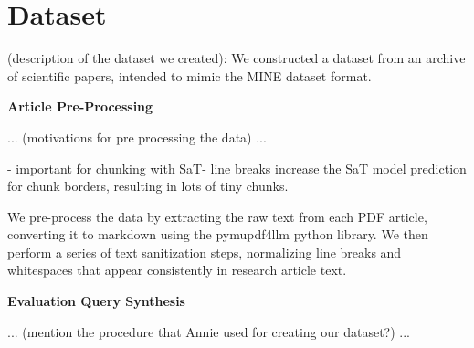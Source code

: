 \section {Dataset}
(description of the dataset we created):
We constructed a dataset from an archive of scientific papers, intended to
mimic the MINE dataset format. 

\textbf{Article Pre-Processing}

... (motivations for pre processing the data) ...

- important for chunking with SaT- line breaks increase the SaT model
prediction for chunk borders, resulting in lots of tiny chunks.


We pre-process the data by extracting the raw text from each PDF article, converting
it to markdown using the pymupdf4llm python library. We then perform a series of text
sanitization steps, normalizing line breaks and whitespaces that appear consistently
in research article text.

\textbf{Evaluation Query Synthesis}

... (mention the procedure that Annie used for creating our dataset?) ...